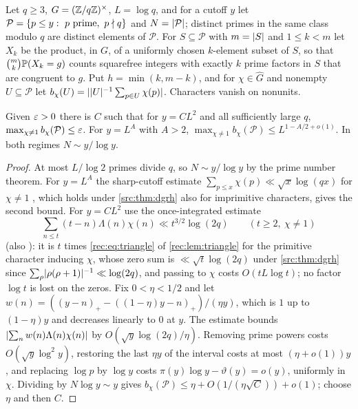 Let $q\ge3$, $G=(\mathbb{Z}/q\mathbb{Z})^\times$, $L=\log q$, and for a cutoff $y$ let
$\mathcal P=\set{p\le y:\ p\text{ prime},\ p\nmid q}$ and $N=\lvert\mathcal P\rvert$; distinct primes
in the same class modulo $q$ are distinct elements of $\mathcal P$. For
$S\subseteq\mathcal P$ with $m=\lvert S\rvert$ and $1\le k<m$ let $X_k$ be the product, in $G$, of a
uniformly chosen $k$-element subset of $S$, so that $\binom mk\mathbb{P}(X_k=g)$ counts squarefree
integers with exactly $k$ prime factors in $S$ that are congruent to $g$. Put $h=\min(k,m-k)$,
and for $\chi\in\widehat G$ and nonempty $U\subseteq\mathcal P$ let
$b_\chi(U)=\lvert\lvert U\rvert^{-1}\sum_{p\in U}\chi(p)\rvert$. Characters vanish on nonunits.

\begin{lemma}\label{dir:lem:bias}
Given $\varepsilon>0$ there is $C$ such that for $y=CL^2$ and all sufficiently large $q$,
$\max_{\chi\ne1}b_\chi(\mathcal P)\le\varepsilon$. For $y=L^A$ with $A>2$,
$\max_{\chi\ne1}b_\chi(\mathcal P)\le L^{1-A/2+o(1)}$. In both regimes $N\sim y/\log y$.
\end{lemma}

\begin{proof}
At most $L/\log2$ primes divide $q$, so $N\sim y/\log y$ by the prime number theorem. For
$y=L^A$ the sharp-cutoff estimate $\sum_{p\le x}\chi(p)\ll\sqrt x\log(qx)$ for $\chi\ne1$
\cite[Theorem~13.7, (13.21)]{MontgomeryVaughan2007Multiplicative}, which holds under
\cref{src:thm:dgrh} also for imprimitive characters, gives the second bound. For $y=CL^2$ use
the once-integrated estimate
\[
 \sum_{n\le t}(t-n)\Lambda(n)\chi(n)\ll t^{3/2}\log(2q)\qquad(t\ge2,\ \chi\ne1)
\]
(also \cite[(13.28)]{MontgomeryVaughan2007Multiplicative}): it is $t$ times \eqref{rec:eq:triangle} of
\cref{rec:lem:triangle} for the primitive character inducing $\chi$, whose zero sum is
$\ll\sqrt t\log(2q)$ under \cref{src:thm:dgrh} since $\sum_\rho\lvert\rho(\rho+1)\rvert^{-1}\ll\log(2q)$, and passing to $\chi$
costs $O(tL\log t)$; no factor $\log t$ is lost on the zeros. Fix $0<\eta<1/2$ and let
$w(n)=((y-n)_+-((1-\eta)y-n)_+)/(\eta y)$, which is $1$ up to $(1-\eta)y$ and decreases
linearly to $0$ at $y$. The estimate bounds $\lvert\sum_nw(n)\Lambda(n)\chi(n)\rvert$ by
$O(\sqrt y\log(2q)/\eta)$. Removing prime powers costs $O(\sqrt y\log^2y)$, restoring the last
$\eta y$ of the interval costs at most $(\eta+o(1))y$, and replacing $\log p$ by $\log y$ costs
$\pi(y)\log y-\vartheta(y)=o(y)$, uniformly in $\chi$. Dividing by $N\log y\sim y$ gives
$b_\chi(\mathcal P)\le\eta+O(1/(\eta\sqrt C))+o(1)$; choose $\eta$ and then $C$.
\end{proof}

